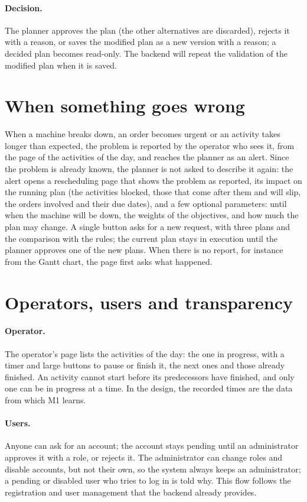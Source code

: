 \paragraph{Decision.} The planner approves the plan (the other alternatives are discarded),
rejects it with a reason, or saves the modified plan as a new version with a reason; a decided
plan becomes read-only. The backend will repeat the validation of the modified plan when it is
saved.

\section{When something goes wrong}
\label{sec:ui-reschedule}

When a machine breaks down, an order becomes urgent or an activity takes longer than expected,
the problem is reported by the operator who sees it, from the page of the activities of the day,
and reaches the planner as an alert. Since the problem is already known, the planner is not
asked to describe it again: the alert opens a rescheduling page that shows the problem as
reported, its impact on the running plan (the activities blocked, those that come after them and
will slip, the orders involved and their due dates), and a few optional parameters: until when
the machine will be down, the weights of the objectives, and how much the plan may change. A
single button asks for a new request, with three plans and the comparison with the rules; the
current plan stays in execution until the planner approves one of the new plans. When there is
no report, for instance from the Gantt chart, the page first asks what happened.

\section{Operators, users and transparency}
\label{sec:ui-other}

\paragraph{Operator.} The operator's page lists the activities of the day: the one in progress,
with a timer and large buttons to pause or finish it, the next ones and those already finished.
An activity cannot start before its predecessors have finished, and only one can be in progress
at a time. In the design, the recorded times are the data from which M1 learns.

\paragraph{Users.} Anyone can ask for an account; the account stays pending until an
administrator approves it with a role, or rejects it. The administrator can change roles and
disable accounts, but not their own, so the system always keeps an administrator; a pending or
disabled user who tries to log in is told why. This flow follows the registration and user
management that the backend already provides.

